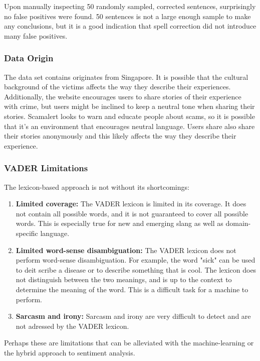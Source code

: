 Upon manually inspecting 50 randomly sampled, corrected sentences, surprisingly no false positives were found. 50 sentences is not a large enough sample to make any conclusions, but it is a good indication that spell correction did not introduce many false positives.

\subsubsection*{Data Origin}

The data set contains originates from Singapore. It is possible that the cultural background of the victims affects the way they describe their experiences. Additionally, the website encourages users to share stories of their experience with crime, but users might be inclined to keep a neutral tone when sharing their stories. Scamalert looks to warn and educate people about scams, so it is possible that it's an environment that encourages neutral language. Users share also share their stories anonymously and this likely affects the way they describe their experience.

\subsubsection*{VADER Limitations}

The lexicon-based approach is not without its shortcomings: 

\begin{enumerate}
    \item \textbf{Limited coverage:} The VADER lexicon is limited in its coverage. It does not contain all possible words, and it is not guaranteed to cover all possible words. This is especially true for new and emerging slang as well as domain-specific language.
    \item \textbf{Limited word-sense disambiguation:} The VADER lexicon does not perform word-sense disambiguation. For example, the word "sick" can be used to deit scribe a disease or to describe something that is cool. The lexicon does not distinguish between the two meanings, and is up to the context to determine the meaning of the word. This is a difficult task for a machine to perform.
    \item \textbf{Sarcasm and irony:} Sarcasm and irony are very difficult to detect and are not adressed by the VADER lexicon.
\end{enumerate}

Perhaps these are limitations that can be alleviated with the machine-learning or the hybrid approach to sentiment analysis.
